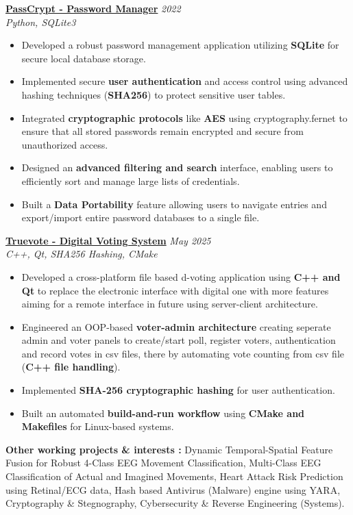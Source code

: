 \documentclass[a4paper]{article}
\begin{document}
\href{https://github.com/aaromalonline/PassCrypt}{\textbf{PassCrypt - Password Manager}} \hfill \textit{2022}\\
{\sl Python, SQLite3}
\begin{itemize}
    \item Developed a robust password management application utilizing \textbf{SQLite} for secure local database storage.
    \item Implemented secure \textbf{user authentication} and access control using advanced hashing techniques (\textbf{SHA256}) to protect sensitive user tables.
    \item Integrated \textbf{cryptographic protocols} like \textbf{AES} using cryptography.fernet to ensure that all stored passwords remain encrypted and secure from unauthorized access.
    \item Designed an \textbf{advanced filtering and search} interface, enabling users to efficiently sort and manage large lists of credentials.
    \item Built a \textbf{Data Portability} feature allowing users to navigate entries and export/import entire password databases to a single file.
\end{itemize}
\vspace*{2mm}

\href{https://github.com/aaromalonline/truevote}{\textbf{Truevote - Digital Voting System}} \hfill \textit{May 2025}\\
{\sl C++, Qt, SHA256 Hashing, CMake}
\begin{itemize}
    \item Developed a cross-platform file based d-voting application using \textbf{C++ and Qt} to replace the electronic interface with digital one with more features aiming for a remote interface in future using server-client architecture.
    \item Engineered an OOP-based \textbf{voter-admin architecture} creating seperate admin and voter panels to create/start poll, register voters, authentication and record votes in csv files, there by automating vote counting from csv file (\textbf{C++ file handling}).
    \item Implemented \textbf{SHA-256 cryptographic hashing} for user authentication.
    \item Built an automated \textbf{build-and-run workflow} using \textbf{CMake and Makefiles} for Linux-based systems.
\end{itemize}
\vspace{10pt}
\textbf{Other working projects \& interests :} Dynamic Temporal-Spatial Feature Fusion for Robust 4-Class EEG Movement Classification, Multi-Class EEG Classification of Actual and Imagined Movements, Heart Attack Risk Prediction using Retinal/ECG data, Hash based Antivirus (Malware) engine using YARA, Cryptography \& Stegnography, Cybersecurity \& Reverse Engineering (Systems).
\newpage
\end{document}
